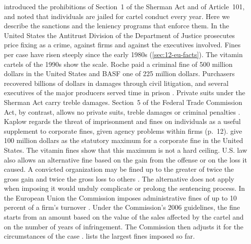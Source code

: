  introduced the prohibitions of Section~1 of the Sherman Act and of Article~101, and noted that
individuals are jailed for cartel conduct every year. Here we describe the sanctions and the leniency programs that
enforce them. In the United States the Antitrust Division of the Department of Justice prosecutes price fixing as a
crime, against firms and against the executives involved. Fines per case have risen steeply since the early 1980s (\cref{sec:12-eu-facts}). The vitamin cartels of the 1990s show the scale. Roche paid a criminal fine of 500 million dollars
in the United States and BASF one of 225 million dollars. Purchasers recovered billions of dollars in damages through
civil litigation, and several executives of the major producers served time in prison
\citep[pp.~1--2]{MarshallMarx2012}. Private suits under the Sherman Act carry treble damages. Section~5 of the Federal
Trade Commission Act, by contrast, allows no private suits, treble damages or criminal penalties
\citep[p.~60, note~21]{Kaplow2013}. Kaplow regards the threat of imprisonment and fines on individuals as a
useful supplement to corporate fines, given agency problems within firms (p.~12). \citet[footnote~8]{ChenRey2013}
give 100 million dollars as the statutory maximum for a corporate fine in the United States. The vitamin fines show
that this maximum is not a hard ceiling. U.S. law also allows an alternative fine based on the gain from the offense
or on the loss it caused. A convicted organization may be fined up to the greater of twice the gross gain and twice
the gross loss to others \citep[\S~3571(c)(2) and (d)]{USCode2024}. The alternative does not apply when imposing it would
unduly complicate or prolong the sentencing process.
In the European Union the Commission imposes administrative fines of up to 10 percent of a firm's turnover
\citep[footnote~8]{ChenRey2013}. Under the Commission's 2006 guidelines, the fine starts from an amount based on the
value of the sales affected by the cartel and on the number of years of infringement. The Commission then adjusts it
for the circumstances of the case \citep[footnote~8]{ChenRey2013}.  lists the largest fines
imposed so far.

